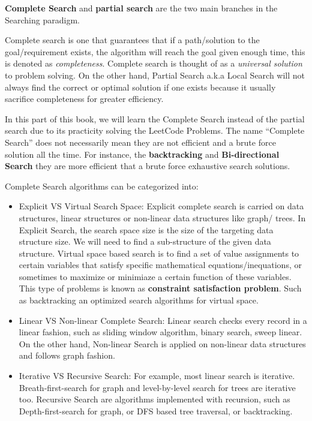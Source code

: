 \documentclass[../main.tex]{subfiles}
\begin{document}
\textbf{ Complete Search} and \textbf{partial search} are the two main branches in the Searching paradigm. 

Complete search is one that guarantees that if a path/solution to the goal/requirement exists, the algorithm will reach the goal given enough time, this is denoted as \textit{completeness}. Complete search is  thought of as a \textit{universal solution} to problem solving.  On the other hand, Partial Search a.k.a Local Search will not always find the correct or optimal solution if one exists because it usually sacrifice completeness for greater efficiency.

In this part of this book,  we will learn the Complete Search instead of the partial search due to its practicity solving the LeetCode Problems. The name ``Complete Search'' does not necessarily mean they are not efficient and a brute force solution all the time. For instance, the \textbf{backtracking} and \textbf{Bi-directional Search} they are more efficient that a brute force exhaustive search solutions. 

Complete Search algorithms can be categorized into:
\begin{itemize}
    \item Explicit VS Virtual Search Space: Explicit complete search is carried on  data structures, linear structures or non-linear data structures like graph/ trees. In Explicit Search, the search space size is the size of the targeting data structure size. We will need to find a sub-structure of the given data structure. Virtual space based search is to find a set of value assignments to certain variables that satisfy specific mathematical equations/inequations, or sometimes to maximize or minimiaze a certain function of these variables. This type of problems is known as \textbf{constraint satisfaction problem}. Such as backtracking an optimized search algorithms for virtual space. 
    \item Linear VS Non-linear Complete Search: Linear search checks every record in a linear fashion, such as sliding window algorithm, binary search, sweep linear. On the other hand, Non-linear Search is applied on non-linear data structures and follows graph fashion. 
    \item Iterative VS Recursive Search: For example, most linear search is iterative. Breath-first-search for graph and level-by-level search for trees are iterative too. Recursive Search are algorithms implemented with recursion, such as Depth-first-search for graph, or DFS based tree traversal, or backtracking. 
\end{itemize}
\end{document}
